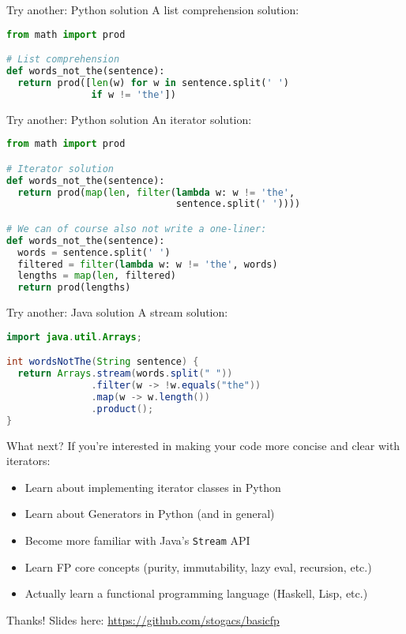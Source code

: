 \documentclass[../index.tex]{subfiles}
\begin{document}
\renewcommand{\currenttitle}{Try another: Python solution}
\begin{frame}[fragile]{\currenttitle}
  A list comprehension solution:

  \begin{lstlisting}[language=Python]
from math import prod

# List comprehension
def words_not_the(sentence):
  return prod([len(w) for w in sentence.split(' ')
               if w != 'the'])
  \end{lstlisting}
\end{frame}

\begin{frame}[fragile]{\currenttitle}
  An iterator solution:

  \begin{lstlisting}[language=Python]
from math import prod

# Iterator solution
def words_not_the(sentence):
  return prod(map(len, filter(lambda w: w != 'the',
                              sentence.split(' '))))

# We can of course also not write a one-liner:
def words_not_the(sentence):
  words = sentence.split(' ')
  filtered = filter(lambda w: w != 'the', words)
  lengths = map(len, filtered)
  return prod(lengths)
  \end{lstlisting}
\end{frame}

\renewcommand{\currenttitle}{Try another: Java solution}
\begin{frame}[fragile]{\currenttitle}
  A stream solution:

  \begin{lstlisting}[language=Java]
import java.util.Arrays;

int wordsNotThe(String sentence) {
  return Arrays.stream(words.split(" "))
               .filter(w -> !w.equals("the"))
               .map(w -> w.length())
               .product();
}
  \end{lstlisting}
\end{frame}

\renewcommand{\currenttitle}{What next?}
\begin{frame}{\currenttitle}
  If you're interested in making your code more concise and clear with
  iterators: \\[1em]

  \begin{itemize}
    \item Learn about implementing iterator classes in Python
    \item Learn about Generators in Python (and in general)
    \item Become more familiar with Java's \texttt{Stream} API
    \item Learn FP core concepts (purity, immutability, lazy eval, recursion, etc.)
    \item Actually learn a functional programming language (Haskell, Lisp, etc.)
  \end{itemize}
\end{frame}

\renewcommand{\currenttitle}{Thanks!}
\begin{frame}[fragile]{\currenttitle}
  Slides here: \url{https://github.com/stogacs/basicfp}
\end{frame}
\end{document}
